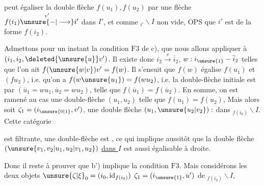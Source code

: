peut égaliser la double flèche $f(u_1),f(u_2)$ par une flèche $f(i_1)\overset{v'}{\unsure{\mathbin{-}|\longrightarrow}}i'$ dans $I'$, et comme  $ {}_{i'}\backslash I$ non vide, OPS que $i'$ est de la forme $f(i_2)$. 


 Admettons pour un instant la condition $\mathrm{F}3$ de c), que nous allons appliquer à $(i_1,i_2,\deleted{\unsure{u}}v')$. Il existe donc $i_2\xrightarrow{v}\overline{i}_2$, $w:i_{\unsure{1}}\mathbin{-}\overline{i}_2$ telles que l'on ait $f(\unsure{w|v})v'=f(w)$. Il s'ensuit que $f(w)$ égalise $f(u_1)$ et $(fu_2)$, i.e. qu'on a $f(w\unsure{u_1})=f(wu_2)$, i.e. la double-flèche initiale est  par $(\overline{u}_1=wu_1,\overline{u}_2=wu_2)$, telle que $f(\overline{u}_1)=f(\overline{u}_2)$. En somme, on est ramené au cas une double-flèche  $(u_1,u_2)$ telle que $f(u_1)=f(u_2)$,  Mais alors soit $\zeta_1=(i_{\unsure{0|1}},v')$,   une double flèche $(u_1,\unsure{u_2|v_2}):$  dans $ {}_{f(i_0)}\backslash I$. Cette catégorie


est filtrante, une  double-flèche est  , ce qui implique aussitôt que la double flèche $(\unsure{v_1,v_2|u_1,u_2|v_1,u_2})$ \uline{dans $I$} est aussi égalisable à droite.

Donc il reste à prouver que b') implique la condition $\mathrm{F}3$. Mais considérons les deux objets $\unsure{\zeta|\xi}_0=(i_0,\mathrm{id}_{f(i_0)})$ $\zeta_1=(i_{\unsure{1}},u')$ de $ {}_{f(i_0)}\backslash I$,


